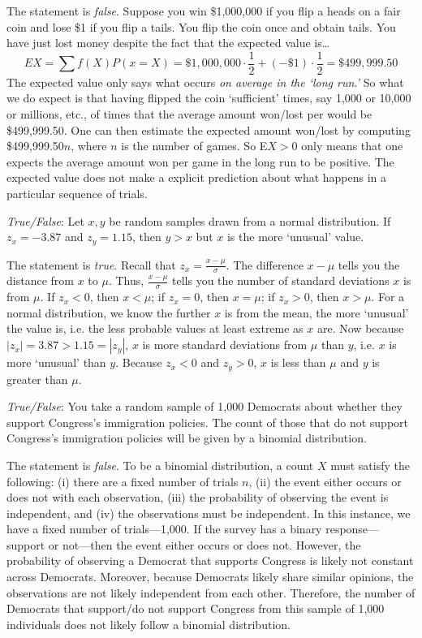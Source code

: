 \documentclass[11pt,letterpaper]{article}
\begin{document}
\sol The statement is \textit{false}. Suppose you win \$1,000,000 if you flip a heads on a fair coin and lose \$1 if you flip a tails. You flip the coin once and obtain tails. You have just lost money despite the fact that the expected value is\dots
	\[
	EX= \sum f(X) P(x= X)= \$1,\!000,\!000 \cdot \dfrac{1}{2} + (-\$1) \cdot \dfrac{1}{2}= \$499,\!999.50
	\]
The expected value only says what occurs \textit{on average in the `long run.'} So what we do expect is that having flipped the coin `sufficient' times, say 1,000 or 10,000 or millions, etc., of times that the average amount won/lost per would be \$499,999.50. One can then estimate the expected amount won/lost by computing \$499,999.50$n$, where $n$ is the number of games. So E$X > 0$ only means that one expects the average amount won per game in the long run to be positive. The expected value does not make a explicit prediction about what happens in a particular sequence of trials. \pvspace{1.3cm}



\quizsol \textit{True/False}: Let $x, y$ be random samples drawn from a normal distribution. If $z_x= -3.87$ and $z_y= 1.15$, then $y > x$ but $x$ is the more `unusual' value. \pspace

\sol The statement is \textit{true}. Recall that $z_x= \frac{x - \mu}{\sigma}$. The difference $x - \mu$ tells you the distance from $x$ to $\mu$. Thus, $\frac{x - \mu}{\sigma}$ tells you the number of standard deviations $x$ is from $\mu$. If $z_x < 0$, then $x < \mu$; if $z_x= 0$, then $x= \mu$; if $z_x > 0$, then $x > \mu$. For a normal distribution, we know the further $x$ is from the mean, the more `unusual' the value is, i.e. the less probable values at least extreme as $x$ are. Now because $|z_x|= 3.87 > 1.15= |z_y|$, $x$ is more standard deviations from $\mu$ than $y$, i.e. $x$ is more `unusual' than $y$. Because $z_x < 0$ and $z_y> 0$, $x$ is less than $\mu$ and $y$ is greater than $\mu$. \pvspace{1.3cm}



\quizsol \textit{True/False}: You take a random sample of 1,000 Democrats about whether they support Congress's immigration policies. The count of those that do not support Congress's immigration policies will be given by a binomial distribution. \pspace

\sol The statement is \textit{false}. To be a binomial distribution, a count $X$ must satisfy the following: (i) there are a fixed number of trials $n$, (ii) the event either occurs or does not with each observation, (iii) the probability of observing the event is independent, and (iv) the observations must be independent. In this instance, we have a fixed number of trials---1,000. If the survey has a binary response---support or not---then the event either occurs or does not. However, the probability of observing a Democrat that supports Congress is likely not constant across Democrats. Moreover, because Democrats likely share similar opinions, the observations are not likely independent from each other. Therefore, the number of Democrats that support/do not support Congress from this sample of 1,000 individuals does not likely follow a binomial distribution. \pvspace{1.3cm}
\end{document}
